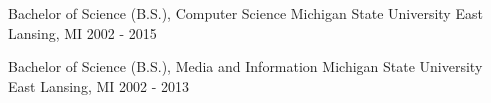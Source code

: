 

\begin{cventries}

  \cventry
    {Bachelor of Science (B.S.), Computer Science} %
    {Michigan State University} %
    {East Lansing, MI} %
    {2002 - 2015} %
    {
      \begin{cvitems} %
      \end{cvitems}
    }


  \cventry
    {Bachelor of Science (B.S.), Media and Information} %
    {Michigan State University} %
    {East Lansing, MI} %
    {2002 - 2013} %
    {
      \begin{cvitems} %
      \end{cvitems}
    }


\end{cventries}
